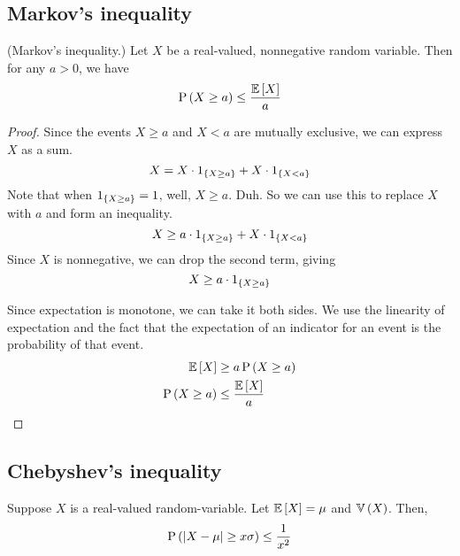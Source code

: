 \documentclass[11pt]{article}
\begin{document}
\subsection{Markov's inequality}

\begin{thm}{(Markov's inequality.)}
    Let $X$ be a real-valued, nonnegative random variable.
    Then for any $a > 0$, we have
    \begin{equation}
        \label{eq:markov-inequality}
        \operatorname{P}{\left(X \geq a\right)} \leq \frac{\operatorname{\mathbb{E}}{\left[X\right]}}{a}
    \end{equation}
\end{thm}

\begin{proof}
    Since the events $X \geq a$ and $X < a$ are mutually exclusive, we can
    express $X$ as a sum.
    \begin{equation*}
        X = X \cdot 1_{\left\{X \geq a\right\}} + X \cdot 1_{\left\{X < a\right\}}
    \end{equation*}
    Note that when $1_{\left\{X \geq a\right\}} = 1$, well, $X \geq a$. Duh.
    So we can use this to replace $X$ with $a$ and form an inequality.
    \begin{equation*}
        X \geq a \cdot 1_{\left\{X \geq a\right\}} + X \cdot 1_{\left\{X < a\right\}}
    \end{equation*}
    Since $X$ is nonnegative, we can drop the second term, giving
    \begin{equation*}
        X \geq a \cdot 1_{\left\{X \geq a\right\}}
    \end{equation*}

    Since expectation is monotone, we can take it both sides.
    We use the linearity of expectation and the fact that the expectation of an
    indicator for an event is the probability of that event.
    \begin{align*}
        \operatorname{\mathbb{E}}{\left[X\right]} &\geq a \operatorname{P}{\left(X \geq a\right)} \\
        \operatorname{P}{\left(X \geq a\right)} & \leq \frac{\operatorname{\mathbb{E}}{\left[X\right]}}{a}
    \end{align*}
\end{proof}

\subsection{Chebyshev's inequality}

\begin{thm}
    \label{thm:chebyshev}
    Suppose $X$ is a real-valued random-variable.
    Let $\operatorname{\mathbb{E}}{\left[X\right]} = \mu$ and $\operatorname{\mathbb{V}}{\left(X\right)}$.
    Then,
    \begin{equation}
        \label{eq:chebyshev-inequality}
        \operatorname{P}{\left(\left\lvert X - \mu\right\rvert \geq x \sigma\right)} \leq \frac{1}{x^2}
    \end{equation}
\end{thm}
\end{document}

